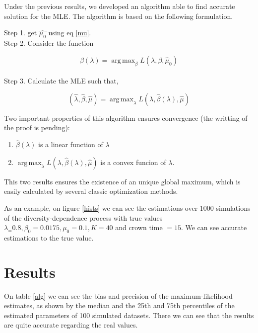 \documentclass[]{article}
\DeclareMathOperator*{\argmax}{arg\,max}
\begin{document}
Under the previous results, we developed an algorithm able to find accurate solution for the MLE. The algorithm is based on the following formulation. 

Step 1. get $\hat{\mu_0}$ using eq \ref{mu}. \\
Step 2. Consider the function 

$$ \hat{\beta}(\lambda) = \displaystyle\argmax_{\beta} L(\lambda,\beta,\hat{\mu}_0) $$
\\
Step 3. Calculate the MLE such that, 


$$ (\hat{\lambda},\hat{\beta},\hat{\mu}) =  \displaystyle\argmax_{\lambda}L(\lambda,\hat{\beta}(\lambda),\hat{\mu}) $$

Two important properties of this algorithm ensures convergence (the writting of the proof is pending): 

\begin{enumerate}
	\item $ \hat{\beta}(\lambda)$ is a linear function of $\lambda$
	\item $\displaystyle\argmax_{\lambda}L(\lambda,\hat{\beta}(\lambda),\hat{\mu})$ is a convex funcion of $\lambda$.
\end{enumerate}

This two results ensures the existence of an unique global maximum, which is easily calculated by several classic optimization methods.

As an example, on figure \ref{hists} we can see the estimations over 1000 simulations of the diversity-dependence process with true values $\lambda_ = 0.8, \beta_0 = 0.0175, \mu_0 = 0.1, K=40$ and crown time $=15$. We can see accurate estimations to the true value. 
\section*{Results}
%
On table \ref{alg} we can see the bias and precision of the maximum-likelihood estimates, as shown by the median and the 25th and 75th percentiles of the estimated parameters of 100 simulated datasets. There we can see that the results are quite accurate regarding the real values. \\
\end{document}
